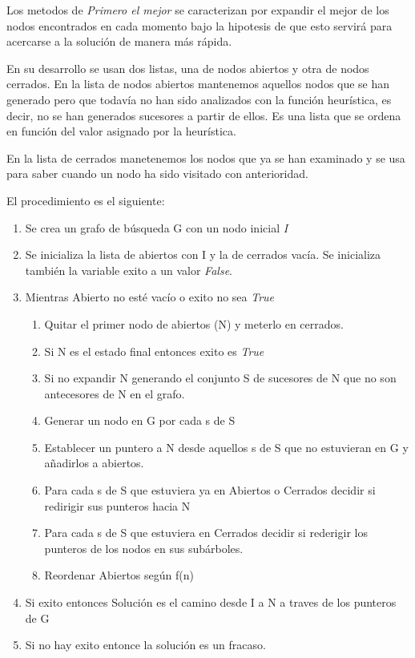 \documentclass[12pt]{article}
\begin{document}
Los metodos de \textit{Primero el mejor} se caracterizan por expandir
el mejor de los nodos encontrados en cada momento bajo la hipotesis de
que esto servirá para acercarse a la solución de manera más rápida.

En su desarrollo se usan dos listas, una de nodos abiertos y otra de
nodos cerrados. En la lista de nodos abiertos mantenemos aquellos
nodos que se han generado pero que todavía no han sido analizados con
la función heurística, es decir, no se han generados sucesores a
partir de ellos. Es una lista que se ordena en función del valor
asignado por la heurística.


En la lista de cerrados manetenemos los nodos que ya se han examinado
y se usa para saber cuando un nodo ha sido visitado con anterioridad.

El procedimiento es el siguiente:

\begin{enumerate}
\item Se crea un grafo de búsqueda G con un nodo inicial \textit{I}
\item Se inicializa la lista de abiertos con I y la de cerrados vacía. Se inicializa también la variable exito a un valor \textit{False}.
\item Mientras Abierto no esté vacío o exito no sea \textit{True}
  \begin{enumerate}
  \item Quitar el primer nodo de abiertos (N) y meterlo en cerrados.
  \item Si N es el estado final entonces exito es \textit{True}
  \item Si no expandir N generando el conjunto S de sucesores de N que
    no son antecesores de N en el grafo.
  \item Generar un nodo en G por cada s de S
  \item Establecer un puntero a N desde aquellos s de S que no
    estuvieran en G y añadirlos a abiertos.
  \item Para cada s de S que estuviera ya en Abiertos o Cerrados decidir si redirigir sus punteros hacia N
  \item Para cada s de S que estuviera en Cerrados decidir si
    rederigir los punteros de los nodos en sus subárboles.
  \item Reordenar Abiertos según f(n)
  \end{enumerate}
\item Si exito entonces Solución es el camino desde I a N a traves de los punteros de G
\item Si no hay exito entonce la solución es un fracaso.
\end{enumerate}
\end{document}
